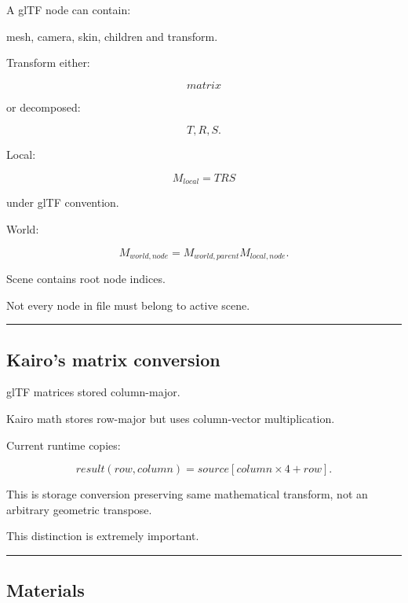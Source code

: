 \hypertarget{04-visual-computing-ii-ch041-nodes}{}

A glTF node can contain:

mesh, camera, skin, children and transform.

Transform either:

\[
matrix
\]

or decomposed:

\[
T,R,S.
\]

Local:

\[
M_{local}
=
T
R
S
\]

under glTF convention.

World:

\[
\boxed{
M_{world,node}
=
M_{world,parent}
M_{local,node}.
}
\]

Scene contains root node indices.

Not every node in file must belong to active scene.

\begin{center}\rule{0.5\linewidth}{0.5pt}\end{center}

\subsection{Kairo's matrix conversion}\label{04-visual-computing-ii-ch041-kairos-matrix-conversion}

\hypertarget{04-visual-computing-ii-ch041-kairos-matrix-conversion}{}

glTF matrices stored column-major.

Kairo math stores row-major but uses column-vector multiplication.

Current runtime copies:

\[
result(row,column)
=
source[column\times4+row].
\]

This is storage conversion preserving same mathematical transform, not an arbitrary geometric transpose.

This distinction is extremely important.

\begin{center}\rule{0.5\linewidth}{0.5pt}\end{center}

\subsection{Materials}\label{04-visual-computing-ii-ch041-materials}

\hypertarget{04-visual-computing-ii-ch041-materials}{}

